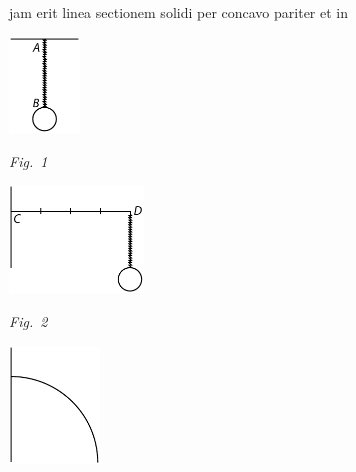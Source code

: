 %
jam erit linea sectionem solidi%
\protect{} per
%
%
concavo pariter et in 
\pend
%
 \vspace{1.5em}%
  \centerline{\hspace*{-60mm}\includegraphics[width=0.14\textwidth]{gesamttex/edit_VIII,3/images/LH_37_05_118_d1.pdf}}%
  \vspace*{0.5em}
  \centerline{\hspace*{-60mm}\lbrack\textit{Fig.~1}\rbrack}%
  \label{LH_37_05_118r_Fig.1}%
%
%
  \vspace{-10.0em}%
  \centerline{\hspace*{60mm}\includegraphics[width=0.268\textwidth]{gesamttex/edit_VIII,3/images/LH_37_05_118_d2.pdf}}%
  \vspace*{0.5em}
  \centerline{\hspace*{60mm}\lbrack\textit{Fig.~2}\rbrack}%
  \label{LH_37_05_118r_Fig.2}%
%
\newpage
%
%
  \centerline{\hspace*{-60mm}\includegraphics[width=0.18\textwidth]{gesamttex/edit_VIII,3/images/LH_37_05_118_d3.pdf}}%
  \vspace*{0.5em}
